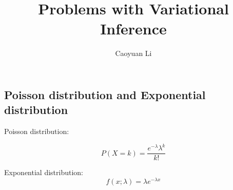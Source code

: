 \documentclass{article}
\title{Problems with Variational Inference}
\author{Caoyuan Li}
\begin{document}
\begin{CJK}{UTF8}{<font>}


\maketitle

\section{Poisson distribution and Exponential distribution}
Poisson distribution: 

\begin{equation}
P(X=k)=\frac{e^{-\lambda}\lambda^k}{k!}
\end{equation}

Exponential distribution:
\begin{equation}
f(x;\lambda)={\lambda}e^{-\lambda x}
\end{equation}


\end{CJK}
\end{document}
